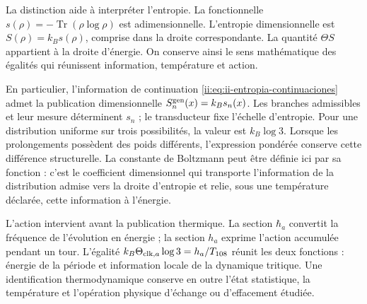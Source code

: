 La distinction aide à interpréter l'entropie. La fonctionnelle
\(s(\rho)=-\operatorname{Tr}(\rho\log\rho)\) est adimensionnelle.
L'entropie dimensionnelle est \(S(\rho)=k_Bs(\rho)\), comprise dans
la droite correspondante. La quantité \(\Theta S\) appartient à
la droite d'énergie. On conserve ainsi le sens mathématique des
égalités qui réunissent information, température et action.

En particulier, l'information de continuation
\eqref{ii:eq:ii-entropia-continuaciones} admet la publication dimensionnelle
\(S_n^{\rm gen}(x)=k_Bs_n(x)\). Les branches admissibles et leur mesure
déterminent \(s_n\) ; le transducteur fixe l'échelle d'entropie. Pour
une distribution uniforme sur trois possibilités, la valeur est
\(k_B\log3\). Lorsque les prolongements possèdent des poids différents,
l'expression pondérée conserve cette différence structurelle. La
constante de Boltzmann peut être définie ici par sa fonction : c'est le
coefficient dimensionnel qui transporte l'information de la
distribution admise vers la droite d'entropie et relie, sous une
température déclarée, cette information à l'énergie.

L'action intervient avant la publication thermique. La section
\(\hbar_a\) convertit la fréquence de l'évolution en énergie ;
la section \(h_a\) exprime l'action accumulée pendant un tour.
L'égalité \(k_B\Theta_{{\rm clk},a}\log3=h_a/T_{108}\)
réunit les deux fonctions : énergie de la période et information locale de
la dynamique tritique. Une identification thermodynamique conserve
en outre l'état statistique, la température et l'opération physique
d'échange ou d'effacement étudiée.
